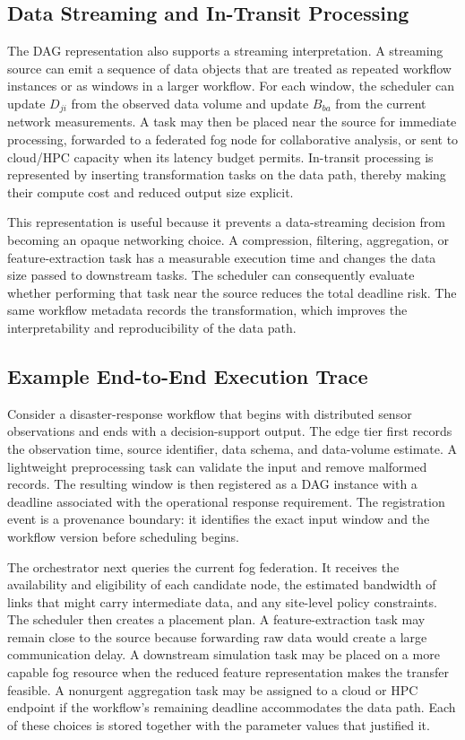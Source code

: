 \subsection{Data Streaming and In-Transit Processing}

The DAG representation also supports a streaming interpretation. A streaming source can emit a sequence of data objects that are treated as repeated workflow instances or as windows in a larger workflow. For each window, the scheduler can update $D_{ji}$ from the observed data volume and update $B_{ba}$ from the current network measurements. A task may then be placed near the source for immediate processing, forwarded to a federated fog node for collaborative analysis, or sent to cloud/HPC capacity when its latency budget permits. In-transit processing is represented by inserting transformation tasks on the data path, thereby making their compute cost and reduced output size explicit.

This representation is useful because it prevents a data-streaming decision from becoming an opaque networking choice. A compression, filtering, aggregation, or feature-extrac\-tion task has a measurable execution time and changes the data size passed to downstream tasks. The scheduler can consequently evaluate whether performing that task near the source reduces the total deadline risk. The same workflow metadata records the transformation, which improves the interpretability and reproducibility of the data path.

\subsection{Example End-to-End Execution Trace}

Consider a disaster-response workflow that begins with distributed sensor observations and ends with a decision-support output. The edge tier first records the observation time, source identifier, data schema, and data-volume estimate. A lightweight preprocessing task can validate the input and remove malformed records. The resulting window is then registered as a DAG instance with a deadline associated with the operational response requirement. The registration event is a provenance boundary: it identifies the exact input window and the workflow version before scheduling begins.

The orchestrator next queries the current fog federation. It receives the availability and eligibility of each candidate node, the estimated bandwidth of links that might carry intermediate data, and any site-level policy constraints. The scheduler then creates a placement plan. A feature-extraction task may remain close to the source because forwarding raw data would create a large communication delay. A downstream simulation task may be placed on a more capable fog resource when the reduced feature representation makes the transfer feasible. A nonurgent aggregation task may be assigned to a cloud or HPC endpoint if the workflow's remaining deadline accommodates the data path. Each of these choices is stored together with the parameter values that justified it.

